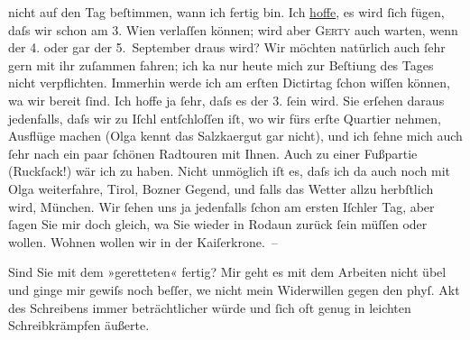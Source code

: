                nicht {\pb}auf den Tag beſtimmen, wann ich fertig bin. Ich
                  \uline{hoffe}, es wird ſich fügen, daſs wir schon am
                  3.{ }Wien verlaſſen können; wird aber \textsc{Gerty} auch warten, wenn der 4. oder gar der 5. September
               draus wird? Wir möchten natürlich auch ſehr gern mit ihr zuſammen fahren; ich ka{\geminationn} nur heute mich zur Beſti{\geminationm}ung des Tages nicht verpflichten. Immerhin werde ich am erſten Dictirtag ſchon
               wiſſen können, wa{\geminationn} wir bereit ſind. Ich hoffe ja ſehr,
               daſs es der 3.{ }ſein wird. Sie erſehen daraus {\pb}jedenfalls, daſs wir zu Iſchl entſchloſſen iſt, wo wir fürs erſte Quartier nehmen, Ausflüge machen
                  (Olga kennt das Salzka{\geminationm}ergut gar nicht), und ich
               ſehne mich auch ſehr nach ein paar ſchönen Radtouren mit Ihnen. Auch zu einer
               Fußpartie (Ruckſack!) wär ich zu haben. Nicht unmöglich iſt es, daſs ich da{\geminationn} auch noch mit Olga weiterfahre, Tirol, Bozner Gegend, und falls das Wetter allzu
               herbſtlich wird, München. Wir ſehen uns ja
               jedenfalls ſchon am ersten {\pb}Iſchler Tag, aber ſagen Sie mir doch gleich, wa{\geminationn}{ }Sie wieder in Rodaun zurück ſein müſſen oder wollen. Wohnen wollen wir in der Kaiſerkrone. –\pend
           
\pstart
           Sind Sie mit dem »geretteten« fertig? Mir geht
               es mit dem Arbeiten nicht übel und ginge mir gewiſs noch beſſer, we{\geminationn} nicht mein Widerwillen gegen den phyſ. Akt des
               Schreibens immer beträchtlicher würde und ſich oft genug in leichten Schreibkrämpfen
               äußerte.\pend
           
